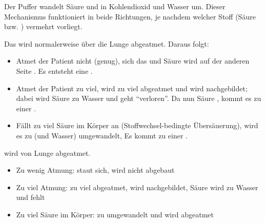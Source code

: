 {%
\label{topic:bikarbonatpuffer}
Der  Puffer wandelt Säure  und
 in Kohlendioxid  und
Wasser  um. Dieser Mechanismus funktioniert in
beide Richtungen, je nachdem welcher Stoff (Säure bzw.
) vermehrt vorliegt.

\bigskip
{}

Das  wird normalerweise über die Lunge abgeatmet. Daraus folgt:

\begin{itemize}
  \item Atmet der Patient nicht (genug), 
  sich das  und Säure wird auf der anderen Seite . Es entsteht eine .
  \item Atmet der Patient zu viel, wird zu viel
   abgeatmet und wird nachgebildet; dabei wird Säure
  zu Wasser und geht \enquote{verloren}. Da nun Säure
  , kommt es zu einer .
  \item Fällt zu viel Säure im
  Körper an (Stoffwechsel-bedingte Übersäuerung), wird
  es zu   (und Wasser) umgewandelt,  Es kommt zu einer .
\end{itemize}
}{%

 wird von Lunge abgeatmet.
\begin{itemize}
  \item Zu wenig Atmung:  staut
  sich,  wird nicht abgebaut

  \item Zu viel Atmung:  zu viel  abgeatmet,  wird
  nachgebildet, Säure wird zu Wasser und fehlt

  \item Zu viel Säure  im
  Körper: zu  umgewandelt und wird abgeatmet
\end{itemize}
}{}{}{}








